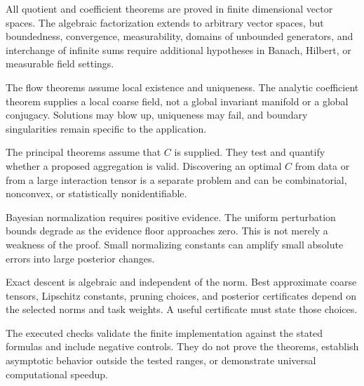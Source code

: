\begin{PRIQboundary}
All quotient and coefficient theorems are proved in finite dimensional vector spaces.  The algebraic factorization extends to arbitrary vector spaces, but boundedness, convergence, measurability, domains of unbounded generators, and interchange of infinite sums require additional hypotheses in Banach, Hilbert, or measurable field settings.
\end{PRIQboundary}

\begin{PRIQboundary}
The flow theorems assume local existence and uniqueness.  The analytic coefficient theorem supplies a local coarse field, not a global invariant manifold or a global conjugacy.  Solutions may blow up, uniqueness may fail, and boundary singularities remain specific to the application.
\end{PRIQboundary}

\begin{PRIQboundary}
The principal theorems assume that $C$ is supplied.  They test and quantify whether a proposed aggregation is valid.  Discovering an optimal $C$ from data or from a large interaction tensor is a separate problem and can be combinatorial, nonconvex, or statistically nonidentifiable.
\end{PRIQboundary}

\begin{PRIQboundary}
Bayesian normalization requires positive evidence.  The uniform perturbation bounds degrade as the evidence floor approaches zero.  This is not merely a weakness of the proof.  Small normalizing constants can amplify small absolute errors into large posterior changes.
\end{PRIQboundary}

\begin{PRIQboundary}
Exact descent is algebraic and independent of the norm.  Best approximate coarse tensors, Lipschitz constants, pruning choices, and posterior certificates depend on the selected norms and task weights.  A useful certificate must state those choices.
\end{PRIQboundary}

\begin{PRIQboundary}
The executed checks validate the finite implementation against the stated formulas and include negative controls.  They do not prove the theorems, establish asymptotic behavior outside the tested ranges, or demonstrate universal computational speedup.
\end{PRIQboundary}

